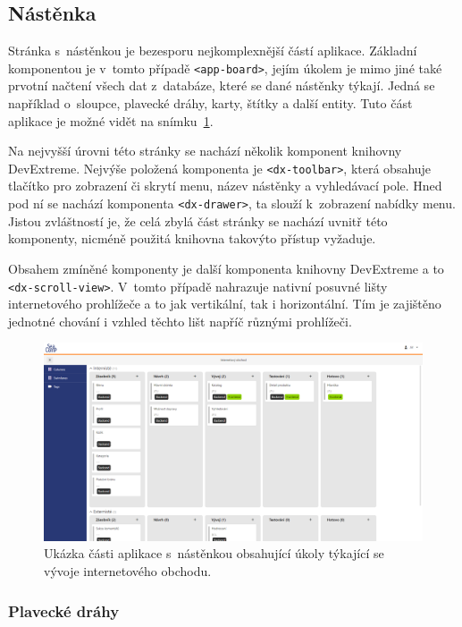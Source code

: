 \subsection{Nástěnka}
Stránka s~nástěnkou je bezesporu nejkomplexnější částí aplikace. Základní komponentou je v~tomto případě \texttt{<app-board>}, jejím úkolem je mimo jiné také prvotní načtení všech dat z~databáze, které se dané nástěnky týkají. Jedná se například o~sloupce, plavecké dráhy, karty, štítky a další entity. Tuto část aplikace je možné vidět na snímku~\ref{img:board}.

Na nejvyšší úrovni této stránky se nachází několik komponent knihovny DevExtreme. Nejvýše položená komponenta je \texttt{<dx-toolbar>}, která obsahuje tlačítko pro zobrazení či skrytí menu, název nástěnky a vyhledávací pole. Hned pod ní se nachází komponenta \texttt{<dx-drawer>}, ta slouží k~zobrazení nabídky menu. Jistou zvláštností je, že celá zbylá část stránky se nachází uvnitř této komponenty, nicméně použitá knihovna takovýto přístup vyžaduje.

Obsahem zmíněné komponenty je další komponenta knihovny DevExtreme a to \texttt{<dx-scroll-view>}. V~tomto případě nahrazuje nativní posuvné lišty internetového prohlížeče a to jak vertikální, tak i horizontální. Tím je zajištěno jednotné chování i vzhled těchto lišt napříč různými prohlížeči.

\begin{figure}[H]
	\centering
	\label{img:board}
	\includegraphics[width=\textwidth]{obrazky-figures/board.png}
	\caption{Ukázka části aplikace s~nástěnkou obsahující úkoly týkající se vývoje internetového obchodu.}
\end{figure}

\subsubsection*{Plavecké dráhy}

